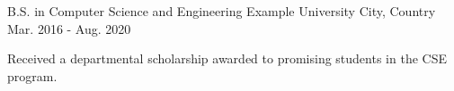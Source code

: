 

\begin{cventries}

  \cventry
    {B.S. in Computer Science and Engineering} %
    {Example University} %
    {City, Country} %
    {Mar. 2016 - Aug. 2020} %
    {
      \begin{cvitems} %
        \item {Received a departmental scholarship awarded to promising students in the CSE program.}
      \end{cvitems}
    }

\end{cventries}
